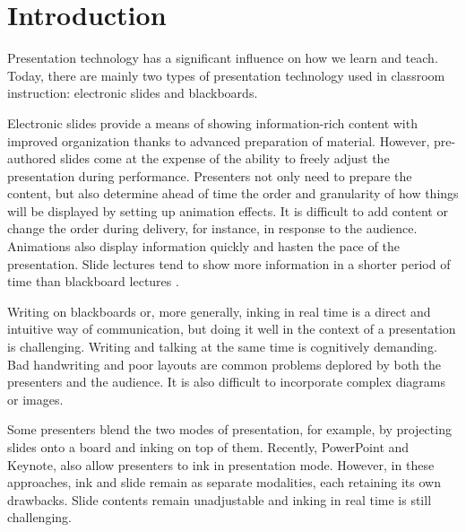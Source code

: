 \section{Introduction}

Presentation technology has a significant influence on how we learn and teach. 
Today, there are mainly two types of presentation technology used in classroom instruction: electronic slides and blackboards. 

Electronic slides provide a means of showing information-rich content with improved organization thanks to advanced preparation of material. However, pre-authored slides come at the expense of the ability to freely adjust the presentation during performance. Presenters not only need to prepare the content, but also determine ahead of time the order and granularity of how things will be displayed by setting up animation effects. It is difficult to add content or change the order during delivery, for instance, in response to the audience. Animations also display information quickly and hasten the pace of the presentation. Slide lectures tend to show more information in a shorter period of time than blackboard lectures \cite{lanir2008observing}.

Writing on blackboards or, more generally, inking in real time is a direct and intuitive way of communication, but doing it well in the context of a presentation is challenging. Writing and talking at the same time is cognitively demanding. Bad handwriting and poor layouts are common problems deplored by both the presenters and the audience. It is also difficult to incorporate complex diagrams or images.

Some presenters blend the two modes of presentation, for example, by projecting slides onto a board and inking on top of them. Recently, PowerPoint and Keynote, also allow presenters to ink in presentation mode. However, in these approaches, ink and slide remain as separate modalities, each retaining its own drawbacks. Slide contents remain unadjustable and inking in real time is still challenging.  

